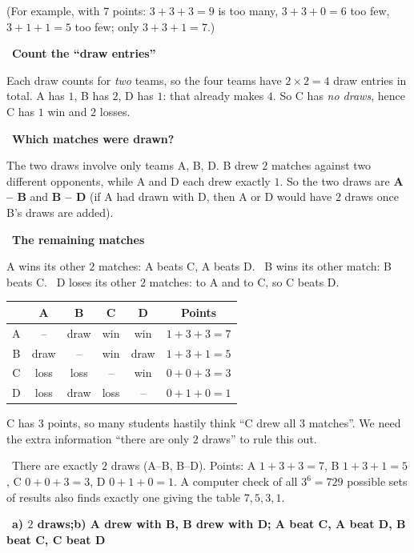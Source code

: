 \documentclass[11pt]{article}
\providecommand{\AnsWord}{Đáp số}
\newcommand{\ans}[1]{\par\smallskip{\bfseries\color{tmGreen!88!black}\AnsWord:}\ {\bfseries\color{AnsRed}#1}\par}
\newcommand{\step}[2]{\par\smallskip\noindent{\bfseries\color{tmBlue!85!black}\StepWord~#1.}\ {\bfseries #2}\par\nopagebreak}
\newcommand{\verify}[1]{\par\smallskip\noindent{\bfseries\color{tmGreen!80!black}\faCheckCircle\ \CheckWord}\ #1\par}
\def\AnsWord{Answer}
\def\StepWord{Step}
\def\CheckWord{Check:}
\begin{document}
{\begin{center}
\begin{tabular}{|c|c|l|}
\end{tabular}
\end{center}
(For example, with $7$ points: $3 + 3 + 3 = 9$ is too many, $3 + 3 + 0 = 6$ too few, $3 + 1 + 1 = 5$ too few; only $3 + 3 + 1 = 7$.)
\step{4}{Count the ``draw entries''}
Each draw counts for \emph{two} teams, so the four teams have $2\times 2 = 4$ draw entries in total. A has $1$, B has $2$, D has $1$:
that already makes $4$. So C has \emph{no draws}, hence C has $1$ win and $2$ losses.
\step{5}{Which matches were drawn?}
The two draws involve only teams A, B, D. B drew $2$ matches against two different opponents, while A and D each drew exactly $1$. So
the two draws are \textbf{A -- B} and \textbf{B -- D} (if A had drawn with D, then A or D would have $2$ draws once B's draws are added).
\step{6}{The remaining matches}
A wins its other $2$ matches: A beats C, A beats D. \ B wins its other match: B beats C. \ D loses its other $2$ matches: to A and to C,
so C beats D.
\begin{center}\small
\begin{tabular}{|c|c|c|c|c|c|}
\hline
\rowcolor{tmBlue!10} & A & B & C & D & Points\\ \hline
A & -- & draw & win & win & $1 + 3 + 3 = 7$\\ \hline
B & draw & -- & win & draw & $1 + 3 + 1 = 5$\\ \hline
C & loss & loss & -- & win & $0 + 0 + 3 = 3$\\ \hline
D & loss & draw & loss & -- & $0 + 1 + 0 = 1$\\ \hline
\end{tabular}
\end{center}
\begin{warnbox}C has $3$ points, so many students hastily think ``C drew all $3$ matches''. We need the extra information ``there are only
$2$ draws'' to rule this out.\end{warnbox}
\verify{There are exactly $2$ draws (A--B, B--D). Points: A $1 + 3 + 3 = 7$, B $1 + 3 + 1 = 5$, C $0 + 0 + 3 = 3$, D $0 + 1 + 0 = 1$. A
computer check of all $3^6 = 729$ possible sets of results also finds exactly one giving the table $7, 5, 3, 1$.}
\ans{a) $2$ draws;\quad b) A drew with B, B drew with D; A beat C, A beat D, B beat C, C beat D}
}
\end{document}
